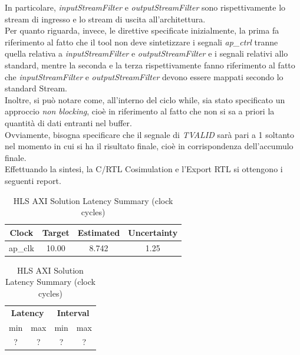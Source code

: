In particolare, \textit{inputStreamFilter} e \textit{outputStreamFilter} sono rispettivamente lo stream di ingresso e lo stream di uscita all'architettura. 
\\
Per quanto riguarda, invece, le direttive specificate inizialmente, la prima fa riferimento al fatto che il tool non deve sintetizzare i segnali \textit{ap\_ctrl} tranne quella relativa a \textit{inputStreamFilter} e \textit{outputStreamFilter} e i segnali relativi allo standard, mentre la seconda e la terza rispettivamente fanno riferimento al fatto che \textit{inputStreamFilter} e \textit{outputStreamFilter} devono essere mappati secondo lo standard Stream.
\\
Inoltre, si può notare come, all'interno del ciclo while, sia stato specificato un approccio \textit{non blocking}, cioè in riferimento al fatto che non si sa a priori la quantità di dati entranti nel buffer.
\\
Ovviamente, bisogna specificare che il segnale di \textit{TVALID} sarà pari a 1 soltanto nel momento in cui si ha il risultato finale, cioè in corrispondenza dell'accumulo finale.
\\
Effettuando la sintesi, la C/RTL Cosimulation e l'Export RTL si ottengono i seguenti report.

\begin{table}[H]
	\centering
	\begin{minipage}[t]{0.45\linewidth}
		\centering
		\begin{tabular}{|c|c|c|c|}
			\hline
			\textbf{Clock} & \textbf{Target} & \textbf{Estimated} & \textbf{Uncertainty} \\
			\hline
			ap\_clk & 10.00 & 8.742 & 1.25 \\
			\hline
		\end{tabular}
		\caption{HLS AXI Solution Timing Summary (ns)}
		\label{tab:hls-axi-solution-timing-summary}
	\end{minipage}
	\hfill
	\begin{minipage}[t]{0.45\linewidth}
		\centering
		\begin{tabular}{|c|c|c|c|}
			\hline
			\multicolumn{2}{|c|}{\textbf{Latency}} & \multicolumn{2}{|c|}{\textbf{Interval}} \\
			min & max & min & max \\
			\hline
			? & ? & ? & ? \\
			\hline
		\end{tabular}
		\caption{HLS AXI Solution Latency Summary (clock cycles)}
		\label{tab:hls-axi-solution-latency-summary}
	\end{minipage}
\end{table}

